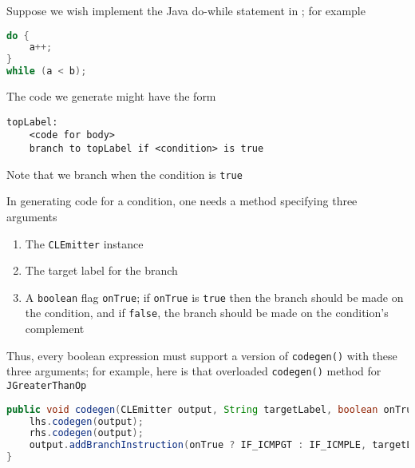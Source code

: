 \documentclass[8pt,a4paper,compress]{beamer}
\begin{document}
\begin{frame}[fragile]
\pause

Suppose we wish implement the Java do-while statement in \jmm; for example

\smallskip

\begin{lstlisting}[language=Java,style=focusin]
do {
    a++;
}
while (a < b);
\end{lstlisting}

The code we generate might have the form

\smallskip

\begin{lstlisting}[language={},style=focusin]
topLabel:
    <code for body>
    branch to topLabel if <condition> is true
\end{lstlisting}

Note that we branch when the condition is \lstinline{true}

\pause
\bigskip

In generating code for a condition, one needs a method specifying three arguments
\begin{enumerate}
\pause
\item The \lstinline{CLEmitter} instance

\pause
\item The target label for the branch

\pause
\item A \lstinline{boolean} flag \lstinline{onTrue}; if \lstinline{onTrue} is \lstinline{true} then the branch should be made on the condition, and if \lstinline{false}, the branch should be made on the condition's complement
\end{enumerate}

\pause
\bigskip

Thus, every boolean expression must support a version of \lstinline{codegen()} with these three arguments;  for example, here is that overloaded \lstinline{codegen()} method for \lstinline{JGreaterThanOp}

\smallskip

\begin{lstlisting}[language=Java,style=focusin]
public void codegen(CLEmitter output, String targetLabel, boolean onTrue) {
    lhs.codegen(output);
    rhs.codegen(output);
    output.addBranchInstruction(onTrue ? IF_ICMPGT : IF_ICMPLE, targetLabel);
}
\end{lstlisting}
\end{frame}
\end{document}
